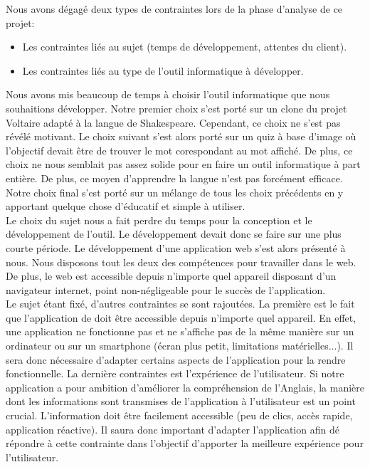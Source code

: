 \documentclass[a4paper,11pt, oneside]{book}
\begin{document}
	Nous avons dégagé deux types de contraintes lors de la phase d'analyse de ce projet:
	\begin{itemize}
		\item Les contraintes liés au sujet (temps de développement, attentes du client).
		\item Les contraintes liés au type de l'outil informatique à développer.\\
	\end{itemize}
Nous avons mis beaucoup de temps à choisir l'outil informatique que nous souhaitions développer. Notre premier choix s'est porté sur un clone du projet Voltaire adapté à la langue de Shakespeare.
Cependant, ce choix ne s'est pas révélé motivant. Le choix suivant s'est alors porté sur un quiz à base d'image où l'objectif devait être de trouver le mot corespondant au mot affiché. De plus, ce choix
ne nous semblait pas assez solide pour en faire un outil informatique à part entière. De plus, ce moyen d'apprendre la langue n'est pas forcément efficace.
Notre choix final s'est porté sur un mélange de tous les choix précédents en y apportant quelque chose d'éducatif et simple à utiliser.\\

Le choix du sujet nous a fait perdre du temps pour la conception et le développement de l'outil. Le développement devait donc se faire sur une plus courte période.
Le développement d'une application web s'est alors présenté à nous. Nous disposons tout les deux des compétences pour travailler dans le web.
De plus, le web est accessible depuis n'importe quel appareil disposant d'un navigateur internet, point non-négligeable pour le succès de l'application.\\

Le sujet étant fixé, d'autres contraintes se sont rajoutées. La première est le fait que l'application de doit être accessible depuis n'importe quel appareil. En effet,
une application ne fonctionne pas et ne s'affiche pas de la même manière sur un ordinateur ou sur un smartphone (écran plus petit, limitations matérielles...). Il sera donc nécessaire
d'adapter certains aspects de l'application pour la rendre fonctionnelle. La dernière contraintes est l'expérience de l'utilisateur. Si notre application a pour ambition d'améliorer
la compréhension de l'Anglais, la manière dont les informations sont transmises de l'application à l'utilisateur est un point crucial. L'information doit être facilement accessible (peu de clics, accès rapide, application réactive).
Il saura donc important d'adapter l'application afin dé répondre à cette contrainte dans l'objectif d'apporter la meilleure expérience pour l'utilisateur.
\end{document}

